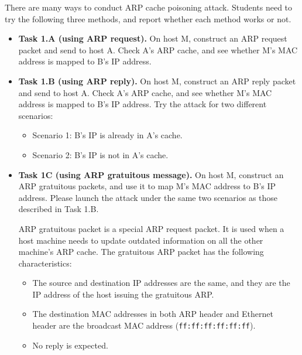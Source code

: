 There are many ways to conduct ARP cache poisoning attack. Students need to try the following
three methods, and report whether each method works or not. 

\begin{itemize}
\item \textbf{Task 1.A (using ARP request).} On host M, construct an ARP request packet and send
to host A. Check A's ARP cache, and see whether M's MAC address is mapped to B's IP address.
    
\item \textbf{Task 1.B (using ARP reply).} On host M, construct an ARP reply packet and send to
host A. Check A's ARP cache, and see whether M's MAC address is mapped to B's IP address.
Try the attack for two different scenarios: 
  
    \begin{itemize}
      \item Scenario 1: B's IP is already in A's cache.
      \item Scenario 2: B's IP is not in A's cache.
    \end{itemize}
     
    
\item \textbf{Task 1C (using ARP gratuitous message).} On host M, construct an ARP gratuitous
packets, and use it to map M's MAC address to B's IP address. Please launch the attack
under the same two scenarios as those described in Task 1.B. 

ARP gratuitous packet is a special ARP request packet. It is used when a host machine
needs to update outdated information on all the other machine's ARP cache. The gratuitous ARP
packet has the following characteristics:

\begin{itemize}
\item The source and destination IP addresses are the same, and they are the IP address of the
host issuing the gratuitous ARP.

\item The destination MAC addresses in both ARP header and Ethernet header are the broadcast
MAC address ({\tt ff:ff:ff:ff:ff:ff}).

\item No reply is expected.
\end{itemize}
\end{itemize}



